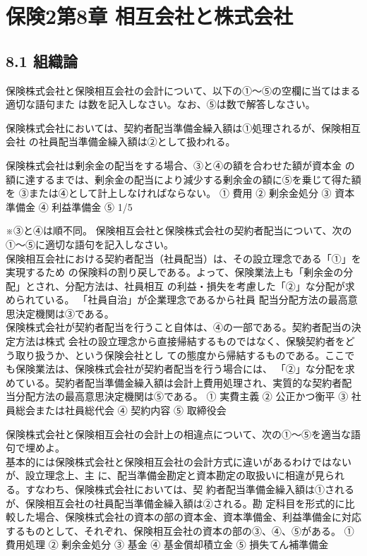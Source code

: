 \documentclass[report,gutter=10mm,fore-edge=10mm,uplatex,dvipdfmx]{jlreq}
\begin{document}
\chapter{保険2第8章 相互会社と株式会社}
\section{8.1 組織論}
保険株式会社と保険相互会社の会計について、以下の①～⑤の空欄に当てはまる適切な語句また
は数を記入しなさい。なお、⑤は数で解答しなさい。

保険株式会社においては、契約者配当準備金繰入額は①処理されるが、保険相互会社
の社員配当準備金繰入額は②として扱われる。

保険株式会社は剰余金の配当をする場合、③と④の額を合わせた額が資本金
の額に達するまでは、剰余金の配当により減少する剰余金の額に⑤を乗じて得た額を
③または④として計上しなければならない。
① 費用  ② 剰余金処分  ③ 資本準備金  ④ 利益準備金  ⑤ 1/5

※③と④は順不同。
保険相互会社と保険株式会社の契約者配当について、次の①～⑤に適切な語句を記入しなさい。\\
保険相互会社における契約者配当（社員配当）は、その設立理念である「①」を実現するため
の保険料の割り戻しである。よって、保険業法上も「剰余金の分配」とされ、分配方法は、社員相互
の利益・損失を考慮した「②」な分配が求められている。
「社員自治」が企業理念であるから社員
配当分配方法の最高意思決定機関は③である。\\
保険株式会社が契約者配当を行うこと自体は、④の一部である。契約者配当の決定方法は株式
会社の設立理念から直接帰結するものではなく、保験契約者をどう取り扱うか、という保険会社とし
ての態度から帰結するものである。ここでも保険業法は、保険株式会社が契約者配当を行う場合には、
「②」な分配を求めている。契約者配当準備金繰入額は会計上費用処理され、実質的な契約者配
当分配方法の最高意思決定機関は⑤である。
① 実費主義 
② 公正かつ衡平 
③ 社員総会または社員総代会 
④ 契約内容 
⑤ 取締役会

保険株式会社と保険相互会社の会計上の相違点について、次の①～⑤を適当な語句で埋めよ。\\
基本的には保険株式会社と保険相互会社の会計方式に違いがあるわけではないが、設立理念上、主
に、配当準備金勘定と資本勘定の取扱いに相違が見られる。すなわち、保険株式会社においては、契
約者配当準備金繰入額は①されるが、保険相互会社の社員配当準備金繰入額は②される。勘
定科目を形式的に比較した場合、保険株式会社の資本の部の資本金、資本準備金、利益準備金に対応
するものとして、それぞれ、保険相互会社の資本の部の③、④、⑤がある。
① 費用処理 
② 剰余金処分 
③ 基金 
④ 基金償却積立金 
⑤ 損失てん補準備金 
\end{document}
